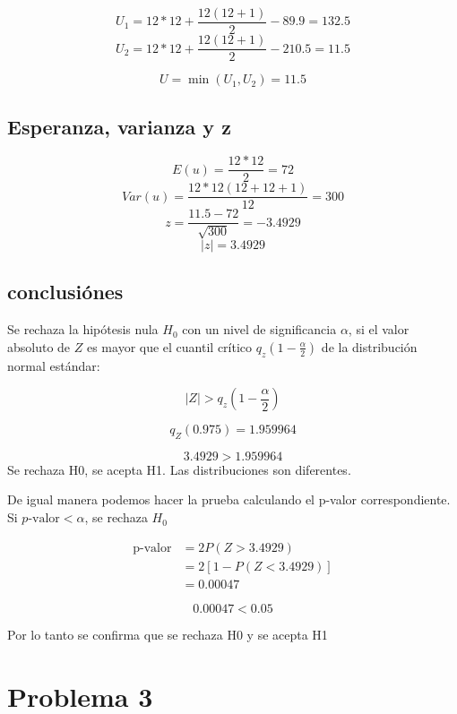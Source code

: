 \documentclass{article}
\begin{document}
\[
    U_1 = 12*12 + \frac{12(12+1)}{2} - 89.9 = 132.5
\]
\[
    U_2 = 12*12 + \frac{12(12+1)}{2} - 210.5 = 11.5
\]

\[
    U = \min(U_1, U_2) = 11.5
\]

\subsection*{Esperanza, varianza y z}

\[
    E(u) = \frac{12*12}{2} = 72
\]
\[
    Var(u) = \frac{12*12(12+12+1)}{12} = 300
\]
\[
    z = \frac{11.5 - 72}{\sqrt{300}} = -3.4929
\]
\[
    |z| = 3.4929
\]

\subsection*{conclusiónes}

Se rechaza la hipótesis nula $H_0$ con un nivel de significancia $\alpha$, si el valor absoluto de $Z$ es mayor que el cuantil crítico $q_z(1-\frac{\alpha}{2})$ de la distribución normal estándar:

\[
    |Z| > q_z\left(1-\frac{\alpha}{2}\right)
\]

\[
    q_Z (0.975) = 1.959964
\]

\[
    3.4929 > 1.959964
\]
Se rechaza H0, se acepta H1. Las distribuciones son diferentes.

De igual manera podemos hacer la prueba calculando el p-valor correspondiente. Si $p\text{-valor} < \alpha$, se rechaza $H_0$

\begin{align*}
    \text{p-valor} & = 2P(Z > 3.4929)                   \\
                   & = 2 \left[1 - P(Z < 3.4929)\right] \\
                   & = 0.00047
\end{align*}

\[0.00047 < 0.05\]

Por lo tanto se confirma que se rechaza H0 y se acepta H1
\newpage
\section{Problema 3}
\end{document}
